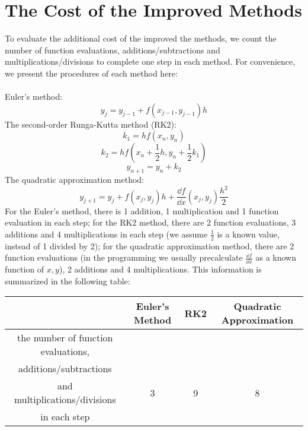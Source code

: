 \documentclass{article}
\begin{document}
\section{The Cost of the Improved Methods}
To evaluate the additional cost of the improved the methods, we count the number of function evaluations, additions/subtractions and multiplications/divisions to complete one step in each method.
For convenience, we present the procedures of each method here: \\
\\
Euler's method:
\begin{equation}
  y_j = y_{j-1} + f(x_{j-1}, y_{j-1})h
\end{equation}
The second-order Runga-Kutta method (RK2):
\begin{equation}
  k_1 = hf(x_n,y_n)
\end{equation}
\begin{equation}
  k_2 = h f(x_n + \frac{1}{2}h, y_n +\frac{1}{2}k_1)
\end{equation}
\begin{equation}
  y_{n+1} = y_n +k_2
\end{equation}
The quadratic approximation method:
\begin{equation}
  y_{j+1} = y_j + f(x_j, y_j)h +  \frac{\dd f}{\dd x}(x_j, y_j) \frac{h^2}{2}
\end{equation}
For the Euler's method, there is 1 addition, 1 multiplication and 1 function evaluation in each step; for the RK2 method, there
are 2 function evaluations, 3 additions and 4 multiplications in each step (we assume \(\frac{1}{2}\) is a known value, instead of 1 divided by 2); for the quadratic approximation method, there are 2 function evaluations (in the programming we usually precalculate \( \frac{\dd f}{\dd x}\) as a known function of \(x,y\)), 2 additions and 4 multiplications.
This information is summarized in the following table:
\begin{center}
\begin{tabular}{||c |c| c| c||}
 \hline
 & Euler's Method & RK2 & Quadratic Approximation \\ [0.5ex]
 \hline\hline
 the number of function evaluations,&&& \\
 additions/subtractions &&&\\
 and multiplications/divisions & 3& 9 & 8\\
  in each step  &  &  &  \\
 \hline
\end{tabular}
\end{center}
\end{document}
